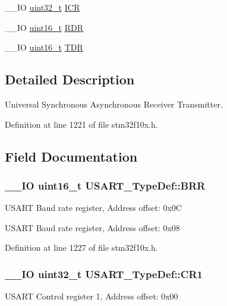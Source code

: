 \begin{DoxyCompactItemize}
\item 
\-\_\-\-\_\-\-I\-O \hyperlink{stdint_8h_a435d1572bf3f880d55459d9805097f62}{uint32\-\_\-t} \hyperlink{struct_u_s_a_r_t___type_def_ab6d6dd2af5463e9e3df458557e09f6cf}{I\-C\-R}
\item 
\-\_\-\-\_\-\-I\-O \hyperlink{stdint_8h_a273cf69d639a59973b6019625df33e30}{uint16\-\_\-t} \hyperlink{struct_u_s_a_r_t___type_def_ab38dd649c7ec25ed70fe49791d45668d}{R\-D\-R}
\item 
\-\_\-\-\_\-\-I\-O \hyperlink{stdint_8h_a273cf69d639a59973b6019625df33e30}{uint16\-\_\-t} \hyperlink{struct_u_s_a_r_t___type_def_a010c9ef83a8236947a3bfaab1ed29df4}{T\-D\-R}
\end{DoxyCompactItemize}


\subsection{Detailed Description}
Universal Synchronous Asynchronous Receiver Transmitter. 

Definition at line 1221 of file stm32f10x.\-h.



\subsection{Field Documentation}
\hypertarget{struct_u_s_a_r_t___type_def_a2044eb2a0a8a731400d309741bceb2f7}{
\subsubsection[{B\-R\-R}]{\setlength{\rightskip}{0pt plus 5cm}\-\_\-\-\_\-\-I\-O {\bf uint16\-\_\-t} U\-S\-A\-R\-T\-\_\-\-Type\-Def\-::\-B\-R\-R}}\label{struct_u_s_a_r_t___type_def_a2044eb2a0a8a731400d309741bceb2f7}
U\-S\-A\-R\-T Baud rate register, Address offset\-: 0x0\-C

U\-S\-A\-R\-T Baud rate register, Address offset\-: 0x08 

Definition at line 1227 of file stm32f10x.\-h.

\hypertarget{struct_u_s_a_r_t___type_def_a6d7dcd3972a162627bc3470cbf992ec4}{
\subsubsection[{C\-R1}]{\setlength{\rightskip}{0pt plus 5cm}\-\_\-\-\_\-\-I\-O {\bf uint32\-\_\-t} U\-S\-A\-R\-T\-\_\-\-Type\-Def\-::\-C\-R1}}\label{struct_u_s_a_r_t___type_def_a6d7dcd3972a162627bc3470cbf992ec4}
U\-S\-A\-R\-T Control register 1, Address offset\-: 0x00 

